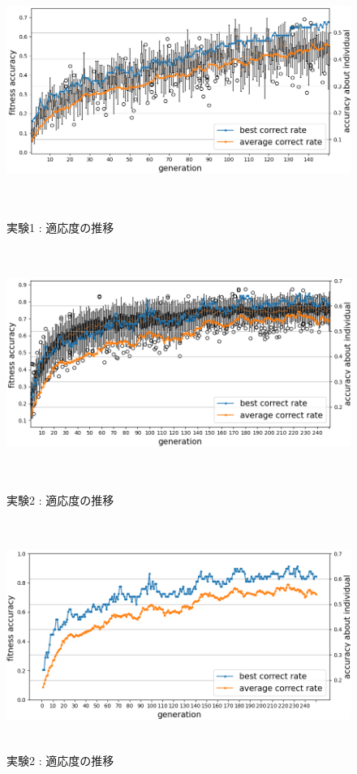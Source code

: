 \documentclass[twocolumn]{jarticle}     %
\begin{document}
\clearpage
\begin{figure}[t]
	\begin{center}
		\vspace*{-15mm}
		\includegraphics[height=75mm,width=180mm]{ex1_boxline.png}
		\caption{実験1 : 適応度の推移\label{fig:ex1_1}}
	\end{center}

	\begin{center}
		\vspace*{-3mm}
		\includegraphics[height=75mm,width=180mm]{ex2_boxline.png}
		\caption{実験2 : 適応度の推移\label{fig:ex2_1}}
	\end{center}

	\begin{center}
		\vspace*{-3mm}
		\includegraphics[height=75mm,width=180mm]{ex2_boxline2.png}
		\caption{実験2 : 適応度の推移\label{fig:ex2_2}}
	\end{center}
\end{figure}
\end{document}
